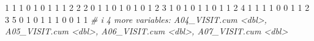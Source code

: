 \documentclass[
]{article}
\newenvironment{Shaded}{\begin{snugshade}}{\end{snugshade}}
\newcommand{\CommentTok}[1]{\textcolor[rgb]{0.56,0.35,0.01}{\textit{#1}}}
\newcommand{\DecValTok}[1]{\textcolor[rgb]{0.00,0.00,0.81}{#1}}
\begin{document}
\begin{Shaded}
\begin{Highlighting}[]
\DecValTok{1}         \DecValTok{1}         \DecValTok{1}         \DecValTok{0}         \DecValTok{1}         \DecValTok{0}         \DecValTok{1}         \DecValTok{1}             \DecValTok{1}             \DecValTok{2}             \DecValTok{2}
\DecValTok{2}         \DecValTok{0}         \DecValTok{1}         \DecValTok{1}         \DecValTok{0}         \DecValTok{1}         \DecValTok{0}         \DecValTok{1}             \DecValTok{0}             \DecValTok{1}             \DecValTok{2}
\DecValTok{3}         \DecValTok{1}         \DecValTok{0}         \DecValTok{1}         \DecValTok{0}         \DecValTok{1}         \DecValTok{1}         \DecValTok{0}             \DecValTok{1}             \DecValTok{1}             \DecValTok{2}
\DecValTok{4}         \DecValTok{1}         \DecValTok{1}         \DecValTok{1}         \DecValTok{1}         \DecValTok{0}         \DecValTok{0}         \DecValTok{1}             \DecValTok{1}             \DecValTok{2}             \DecValTok{3}
\DecValTok{5}         \DecValTok{0}         \DecValTok{1}         \DecValTok{0}         \DecValTok{1}         \DecValTok{1}         \DecValTok{1}         \DecValTok{0}             \DecValTok{0}             \DecValTok{1}             \DecValTok{1}
\CommentTok{\# i 4 more variables: A04\_VISIT.cum \textless{}dbl\textgreater{}, A05\_VISIT.cum \textless{}dbl\textgreater{}, A06\_VISIT.cum \textless{}dbl\textgreater{}, A07\_VISIT.cum \textless{}dbl\textgreater{}}
\end{Highlighting}
\end{Shaded}
\end{document}
